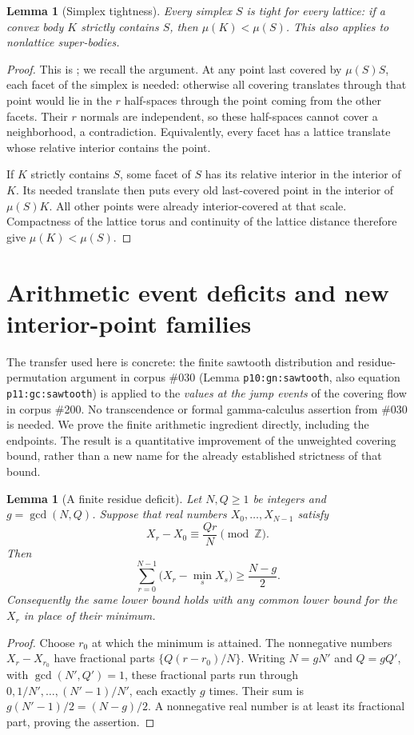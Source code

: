 \documentclass[11pt,a4paper]{article}
\newtheorem{lemma}[theorem]{Lemma}
\theoremstyle{remark}\newtheorem{remark}[theorem]{Remark}
\begin{document}
\begin{lemma}[Simplex tightness]\label{base:tight}
Every simplex $S$ is tight for every lattice: if a convex body
$K$ strictly contains $S$, then $\mu(K)<\mu(S)$.
This also applies to nonlattice super-bodies.
\end{lemma}
\begin{proof}
This is \cite[Lemma 2.7]{CSS}; we recall the argument.
At any point last covered by $\mu(S)S$, each facet of the simplex
is needed: otherwise all covering translates through that point
would lie in the $r$ half-spaces through the point coming from
the other facets. Their $r$ normals are independent, so these
half-spaces cannot cover a neighborhood, a contradiction.
Equivalently, every facet has a lattice translate whose relative
interior contains the point.

If $K$ strictly contains $S$, some facet of $S$ has its relative
interior in the interior of $K$. Its needed translate then puts
every old last-covered point in the interior of $\mu(S)K$.
All other points were already interior-covered at that scale.
Compactness of the lattice torus and continuity of the lattice
distance therefore give $\mu(K)<\mu(S)$.
\end{proof}


\section{Arithmetic event deficits and new interior-point families}
\label{cr6d:section}

The transfer used here is concrete: the finite sawtooth distribution
and residue-permutation argument in corpus \#030
(Lemma \texttt{p10:gn:sawtooth}, also equation
\texttt{p11:gc:sawtooth}) is applied to the \emph{values at the jump
events} of the covering flow in corpus \#200.  No transcendence or
formal gamma-calculus assertion from \#030 is needed.  We prove the
finite arithmetic ingredient directly, including the endpoints.
The result is a quantitative improvement of the unweighted covering
bound, rather than a new name for the already established strictness
of that bound.

\begin{lemma}[A finite residue deficit]\label{cr6d:residue}
Let $N,Q\ge1$ be integers and $g=\gcd(N,Q)$.  Suppose that real
numbers $X_0,\ldots,X_{N-1}$ satisfy
\[
 X_r-X_0\equiv \frac{Qr}{N}\pmod{\mathbb Z}.
\]
Then
\[
 \sum_{r=0}^{N-1}\bigl(X_r-\min_sX_s\bigr)\ge\frac{N-g}{2}.
\]
Consequently the same lower bound holds with any common lower
bound for the $X_r$ in place of their minimum.
\end{lemma}
\begin{proof}
Choose $r_0$ at which the minimum is attained.  The nonnegative
numbers $X_r-X_{r_0}$ have fractional parts
$\{Q(r-r_0)/N\}$.  Writing $N=gN'$ and $Q=gQ'$, with
$\gcd(N',Q')=1$, these fractional parts run through
$0,1/N',\ldots,(N'-1)/N'$, each exactly $g$ times.
Their sum is $g(N'-1)/2=(N-g)/2$.  A nonnegative real number
is at least its fractional part, proving the assertion.
\end{proof}
\end{document}
